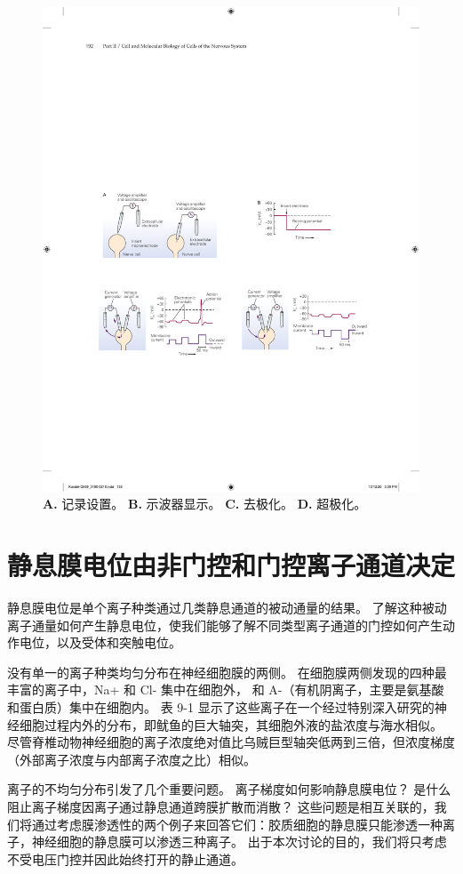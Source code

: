 \begin{figure}[htbp]
	\centering
	\includegraphics[width=0.8\linewidth]{chap09/fig_9_2}
	\caption{\textbf{A.} 记录设置。
	\textbf{B.} 示波器显示。
	\textbf{C.} 去极化。
	\textbf{D.} 超极化。}
	\label{fig:9_2}
\end{figure}



\section{静息膜电位由非门控和门控离子通道决定}

静息膜电位是单个离子种类通过几类静息通道的被动通量的结果。
了解这种被动离子通量如何产生静息电位，使我们能够了解不同类型离子通道的门控如何产生动作电位，以及受体和突触电位。


没有单一的离子种类均匀分布在神经细胞膜的两侧。
在细胞膜两侧发现的四种最丰富的离子中，Na+ 和 Cl- 集中在细胞外， 和 A-（有机阴离子，主要是氨基酸和蛋白质）集中在细胞内。
表 9-1 显示了这些离子在一个经过特别深入研究的神经细胞过程内外的分布，即鱿鱼的巨大轴突，其细胞外液的盐浓度与海水相似。
尽管脊椎动物神经细胞的离子浓度绝对值比乌贼巨型轴突低两到三倍，但浓度梯度（外部离子浓度与内部离子浓度之比）相似。


离子的不均匀分布引发了几个重要问题。
离子梯度如何影响静息膜电位？
是什么阻止离子梯度因离子通过静息通道跨膜扩散而消散？
这些问题是相互关联的，我们将通过考虑膜渗透性的两个例子来回答它们：胶质细胞的静息膜只能渗透一种离子，神经细胞的静息膜可以渗透三种离子。
出于本次讨论的目的，我们将只考虑不受电压门控并因此始终打开的静止通道。



